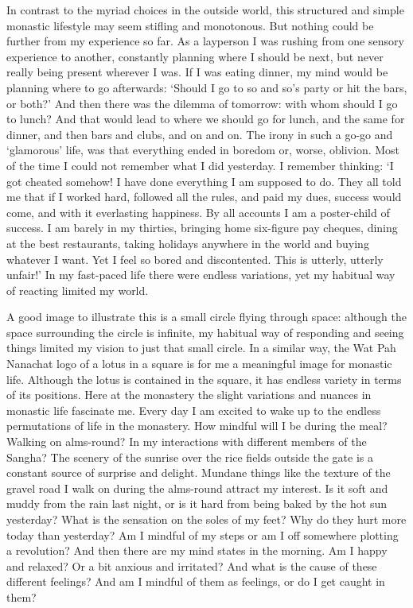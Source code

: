 In contrast to the myriad choices in the outside world, this structured
and simple monastic lifestyle may seem stifling and monotonous. But
nothing could be further from my experience so far. As a layperson I was
rushing from one sensory experience to another, constantly planning
where I should be next, but never really being present wherever I was. 
If I was eating dinner, my mind would be planning where to go
afterwards: `Should I go to so and so's party or hit the bars, or both?'
And then there was the dilemma of tomorrow: with whom should I go to
lunch? And that would lead to where we should go for lunch, and the same
for dinner, and then bars and clubs, and on and on. The irony in such a
go-go and `glamorous' life, was that everything ended in boredom or, 
worse, oblivion. Most of the time I could not remember what I did
yesterday. I remember thinking: `I got cheated somehow! I have done
everything I am supposed to do. They all told me that if I worked hard, 
followed all the rules, and paid my dues, success would come, and with
it everlasting happiness. By all accounts I am a poster-child of
success. I am barely in my thirties, bringing home six-figure pay
cheques, dining at the best restaurants, taking holidays anywhere in the
world and buying whatever I want. Yet I feel so bored and discontented. 
This is utterly, utterly unfair!' In my fast-paced life there were
endless variations, yet my habitual way of reacting limited my world. 

A good image to illustrate this is a small circle flying through space: 
although the space surrounding the circle is infinite, my habitual way
of responding and seeing things limited my vision to just that small
circle. In a similar way, the Wat Pah Nanachat logo of a lotus in a
square is for me a meaningful image for monastic life. Although the
lotus is contained in the square, it has endless variety in terms of its
positions. Here at the monastery the slight variations and nuances in
monastic life fascinate me. Every day I am excited to wake up to the
endless permutations of life in the monastery. How mindful will I be
during the meal? Walking on alms-round? In my interactions with
different members of the Sangha? The scenery of the sunrise over the
rice fields outside the gate is a constant source of surprise and
delight. Mundane things like the texture of the gravel road I walk on
during the alms-round attract my interest. Is it soft and muddy from the
rain last night, or is it hard from being baked by the hot sun
yesterday? What is the sensation on the soles of my feet? Why do they
hurt more today than yesterday? Am I mindful of my steps or am I off
somewhere plotting a revolution? And then there are my mind states in
the morning. Am I happy and relaxed? Or a bit anxious and irritated? And
what is the cause of these different feelings? And am I mindful of them
as feelings, or do I get caught in them? 

